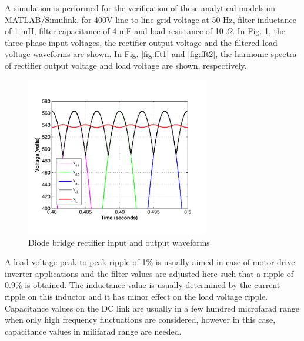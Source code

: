 \documentclass[conference,a4paper,twocolumn]{IEEEtran}
\begin{document}
A simulation is performed for the verification of these analytical models on MATLAB/Simulink, for 400V line-to-line grid voltage at 50 Hz, filter inductance of 1 mH, filter capacitance of 4 mF and load resistance of 10 $\Omega$. In Fig. \ref{fig:rect_wave}, the three-phase input voltages, the rectifier output voltage and the filtered load voltage waveforms are shown. In Fig. \ref{fig:fft1} and \ref{fig:fft2}, the harmonic spectra of rectifier output voltage and load voltage are shown, respectively.
\begin{figure}[h]
  \centering
  \includegraphics[width=8cm]{images/rect_wave}
  \caption{Diode bridge rectifier input and output waveforms}
  \label{fig:rect_wave}
\end{figure}
A load voltage peak-to-peak ripple of 1\% is usually aimed in case of motor drive inverter applications and the filter values are adjusted here such that a ripple of 0.9\% is obtained. The inductance value is usually determined by the current ripple on this inductor and it has minor effect on the load voltage ripple. Capacitance values on the DC link are usually in a few hundred microfarad range when only high frequency fluctuations are considered, however in this case, capacitance values in milifarad range are needed.
\end{document}
